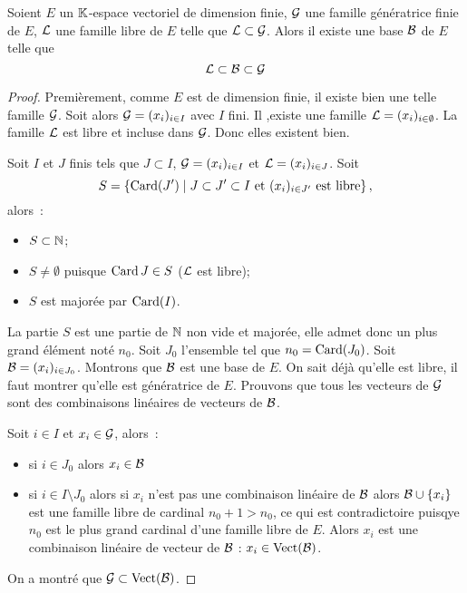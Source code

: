 \begin{theo}
  Soient $E$ un $\mathbb{K}$-espace vectoriel de dimension finie, $\mathcal{G}$ une famille génératrice finie de $E$, $\mathcal{L}$ une famille libre de $E$ telle que $\mathcal{L} \subset \mathcal{G}$. Alors il existe une base $\mathcal{B}$ de $E$ telle que
  \begin{equation}
    \mathcal{L} \subset \mathcal{B} \subset \mathcal{G}
  \end{equation}
\end{theo}
\begin{proof}
  Premièrement, comme $E$ est de dimension finie, il existe bien une telle famille $\mathcal{G}$. Soit alors $\mathcal{G}=(x_i)_{i \in I}$ avec $I$ fini. Il ,existe une famille $\mathcal{L}=(x_i)_{i \in \emptyset}$. La famille $\mathcal{L}$ est libre et incluse dans $\mathcal{G}$. Donc elles existent bien.

  Soit $I$ et $J$ finis tels que $J \subset I$, $\mathcal{G}=(x_i)_{i \in I}$ et $\mathcal{L}=(x_i)_{i \in J}$. Soit
  \begin{equation}
    S = \left\{\operatorname{Card}(J')\mathrel{}\middle|\mathrel{}J \subset J' \subset I \text{~et } (x_i)_{i \in J'} \text{~est libre}\right\},
  \end{equation}
  alors~:
  \begin{itemize}
  \item $S \subset \mathbb{N}$;
  \item $S \neq \emptyset$ puisque $\operatorname{Card} J \in S$ ($\mathcal{L}$ est libre);
  \item $S$ est majorée par $\operatorname{Card}(I)$.
  \end{itemize}
  La partie $S$ est une partie de $\mathbb{N}$ non vide et majorée, elle admet donc un plus grand élément noté $n_0$. Soit $J_0$ l'ensemble tel que $n_0=\operatorname{Card}(J_0)$. Soit $\mathcal{B}=(x_i)_{i \in J_0}$. Montrons que $\mathcal{B}$ est une base de $E$. On sait déjà qu'elle est libre, il faut montrer qu'elle est génératrice de $E$. Prouvons que tous les vecteurs de $\mathcal{G}$ sont des combinaisons linéaires de vecteurs de $\mathcal{B}$. 

  Soit $i \in I$ et $x_i \in \mathcal{G}$, alors~:
  \begin{itemize}
  \item si $i \in J_0$ alors $x_i \in \mathcal{B}$
  \item si $i \in I\setminus J_0$ alors si $x_i$ n'est pas une combinaison linéaire de $\mathcal{B}$ alors $\mathcal{B} \cup \{x_i\}$ est une famille libre de cardinal $n_0+1 >n_0$, ce qui est contradictoire puisqye $n_0$ est le plus grand cardinal d'une famille libre de $E$. Alors $x_i$ est une combinaison linéaire de vecteur de $\mathcal{B}$ : $x_i \in \operatorname{Vect}(\mathcal{B})$.
  \end{itemize}
  On a montré que $\mathcal{G} \subset \operatorname{Vect}(\mathcal{B})$.


\end{proof}
